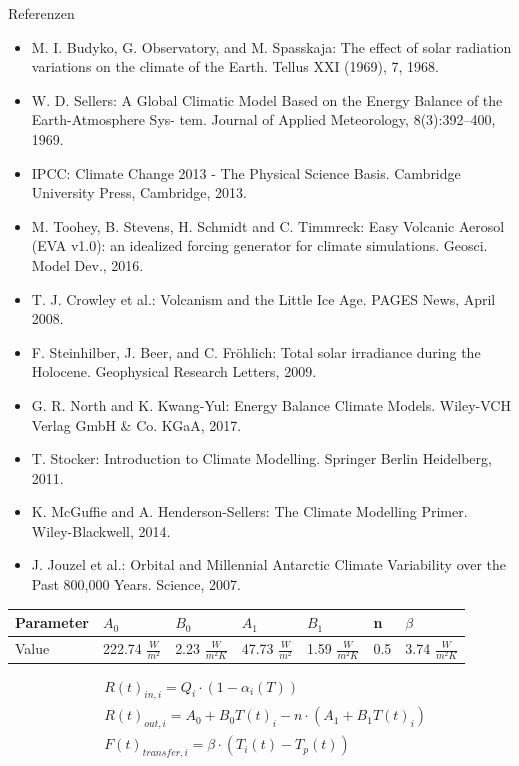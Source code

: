 \documentclass[11pt]{beamer}
\begin{document}
\begingroup
\scriptsize
\begin{frame}{Referenzen}
\begin{flushleft}
\begin{itemize}
\item M. I. Budyko, G. Observatory, and M. Spasskaja: The effect of solar radiation variations on the climate of
the Earth. Tellus XXI (1969), 7, 1968.
\item W. D. Sellers: A Global Climatic Model Based on the Energy Balance of the Earth-Atmosphere Sys-
tem. Journal of Applied Meteorology, 8(3):392–400, 1969.
\item IPCC: Climate Change 2013 - The Physical Science Basis. Cambridge University Press, Cambridge, 2013.
\item M. Toohey, B. Stevens, H. Schmidt and C. Timmreck: Easy Volcanic Aerosol (EVA v1.0): an idealized forcing generator for climate simulations. Geosci. Model Dev., 2016.
\item T. J. Crowley et al.: Volcanism and the Little Ice Age. PAGES News, April 2008.
\item F. Steinhilber, J. Beer, and C. Fröhlich: Total solar irradiance during the Holocene. Geophysical Research Letters, 2009.
\item G. R. North and K. Kwang-Yul: Energy Balance Climate Models. Wiley-VCH Verlag GmbH \& Co. KGaA,
2017.
\item T. Stocker: Introduction to Climate Modelling. Springer Berlin Heidelberg, 2011.
\item K. McGuffie and A. Henderson-Sellers: The Climate Modelling Primer. Wiley-Blackwell, 2014.
\item J. Jouzel et al.: Orbital and Millennial Antarctic Climate Variability over the Past 800,000 Years. Science, 2007.
\end{itemize}
\end{flushleft}
\end{frame}
\endgroup

\begingroup
\small
\begin{frame}[noframenumbering]
\begin{tabular}{l|| l l l l l l}
        Parameter & $A_0$ & $B_0$ & $ A_1$ & $B_1$ & n & $\beta$\\\hline
        Value & 222.74 $\frac{W}{m^2}$ & 2.23 $\frac{W}{m^2K}$ & 47.73 $\frac{W}{m^2}$ & 1.59 $\frac{W}{m^2K}$ & 0.5 & 3.74 $\frac{W}{m^2K}$
\end{tabular}
\begin{align*}
&R(t)_{in,i} = Q_i\cdot(1-\alpha_i(T))\\
&R(t)_{out,i}  = A_0+B_0 T(t)_i - n\cdot(A_1+B_1 T(t)_i)\\
&F(t)_{transfer,i}  =  \beta\cdot(T_i (t) - T_p (t))
\end{align*}
\end{frame}
\end{document}
